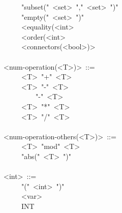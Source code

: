 \begin{mdpre}
~~~~\textbar{}~"subset("~{\textless{}set\textgreater{}}~","~{\textless{}set\textgreater{}}~")"\\
~~~~\textbar{}~"empty("~{\textless{}set\textgreater{}}~")"\\
~~~~\textbar{}~{\textless{}equality(\textless{}int\textgreater{}}\\
~~~~\textbar{}~{\textless{}order(\textless{}int\textgreater{}}\\
~~~~\textbar{}~{\textless{}connectors(\textless{}bool\textgreater{})\textgreater{}}\\
\\
{\textless{}num-operation(\textless{}T\textgreater{})\textgreater{}}~::=\\
~~~~\textbar{}~{\textless{}T\textgreater{}}~"+"~{\textless{}T\textgreater{}}\\
~~~~\textbar{}~{\textless{}T\textgreater{}}~"-"~{\textless{}T\textgreater{}}\\
~~~~\textbar{}~~~~~"-"~{\textless{}T\textgreater{}}\\
~~~~\textbar{}~{\textless{}T\textgreater{}}~"*"~{\textless{}T\textgreater{}}\\
~~~~\textbar{}~{\textless{}T\textgreater{}}~"/"~{\textless{}T\textgreater{}}\\
\\
{\textless{}num-operation-others(\textless{}T\textgreater{})\textgreater{}}~::=\\
~~~~\textbar{}~{\textless{}T\textgreater{}}~"mod"~{\textless{}T\textgreater{}}\\
~~~~\textbar{}~"abs("~{\textless{}T\textgreater{}}~")"\\
\\
{\textless{}int\textgreater{}}~::=\\
~~~~\textbar{}~"("~{\textless{}int\textgreater{}}~")"\\
~~~~\textbar{}~{\textless{}var\textgreater{}}\\
~~~~\textbar{}~INT\\

\end{mdpre}
